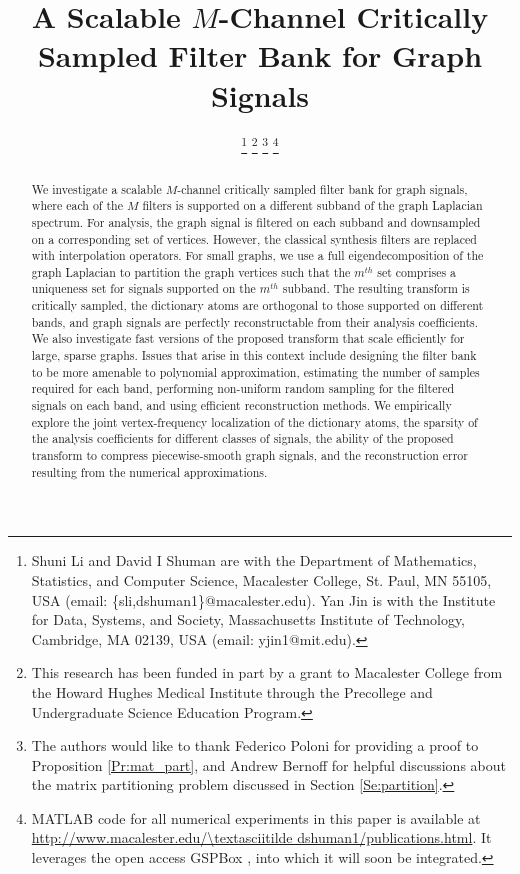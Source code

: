 \documentclass[journal, 10pt]{IEEEtran}
\begin{document}
\title{
A Scalable $M$-Channel Critically Sampled Filter Bank for Graph Signals 
}
\author{
\thanks{Shuni Li and David I Shuman are with the Department of Mathematics, Statistics, and Computer Science, Macalester College, St. Paul, MN 55105, USA (email: \{sli,dshuman1\}@macalester.edu). Yan Jin is with the Institute for Data, Systems, and Society, Massachusetts Institute of Technology, Cambridge, MA 02139, USA (email: yjin1@mit.edu). }
\thanks{This research has been funded in part by a grant to Macalester College from the Howard Hughes Medical Institute through the Precollege and Undergraduate Science Education Program.}
\thanks{The authors would like to thank Federico Poloni for providing a proof to Proposition \ref{Pr:mat_part}, and Andrew Bernoff for helpful discussions about the matrix partitioning problem discussed in Section \ref{Se:partition}.}
\thanks{MATLAB code for all numerical experiments in this paper is available at \url{http://www.macalester.edu/\textasciitilde dshuman1/publications.html}. It leverages the open access GSPBox \cite{gspbox}, into which it will soon be integrated.}}

\maketitle


\begin{abstract}
We investigate a scalable $M$-channel critically sampled filter bank for graph signals, where each of the $M$ filters is supported on a different subband of the graph Laplacian spectrum. For analysis, the graph signal is filtered on each subband and downsampled on a corresponding set of vertices. However, the classical synthesis filters are replaced with interpolation operators. For small graphs, we use a full eigendecomposition of the graph Laplacian to partition the graph vertices such that the $m^{th}$ set comprises a uniqueness set for signals supported on the $m^{th}$ subband. The resulting transform is critically sampled, the dictionary atoms are orthogonal to those supported on different bands, and graph signals are perfectly reconstructable from their analysis coefficients. We also investigate fast versions of the proposed transform that scale efficiently for large, sparse graphs. Issues that arise in this context include designing the filter bank to be more amenable to polynomial approximation, estimating the number of samples required for each band, performing non-uniform random sampling for the filtered signals on each band, and using efficient reconstruction methods. We empirically explore the joint vertex-frequency localization of the dictionary atoms, the sparsity of the analysis coefficients for different classes of signals, the ability of the proposed transform to compress piecewise-smooth graph signals, and the reconstruction error resulting from the numerical approximations.
\end{abstract}
\end{document}

